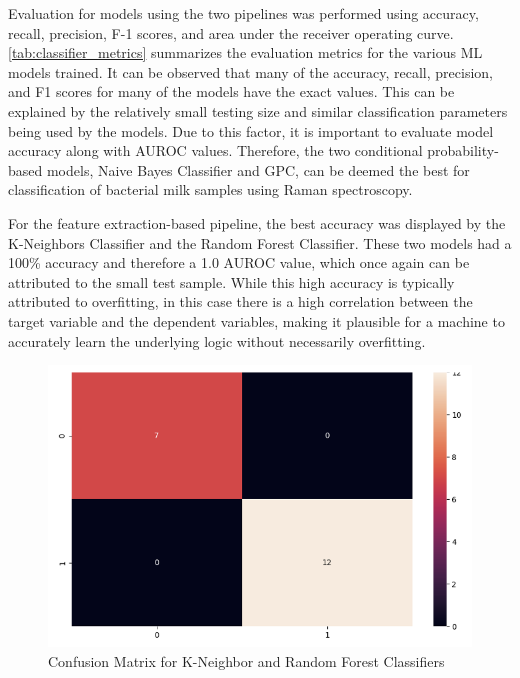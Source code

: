 Evaluation for models using the two pipelines was performed using accuracy, recall, precision, F-1 scores, and area under the receiver operating curve. \autoref{tab:classifier_metrics} summarizes the evaluation metrics for the various ML models trained. It can be observed that many of the accuracy, recall, precision, and F1 scores for many of the models have the exact values. This can be explained by the relatively small testing size and similar classification parameters being used by the models. Due to this factor, it is important to evaluate model accuracy along with AUROC values. Therefore, the two conditional probability-based models, Naive Bayes Classifier and GPC, can be deemed the best for classification of bacterial milk samples using Raman spectroscopy. \\

\begin{table}[htbp]
\raggedright
\caption{Performance comparison of various classifiers}
\label{tab:classifier_metrics}
\end{table}


\noindent For the feature extraction-based pipeline, the best accuracy was displayed by the K-Neighbors Classifier and the Random Forest Classifier. These two models had a 100\% accuracy and therefore a 1.0 AUROC value, which once again can be attributed to the small test sample. While this high accuracy is typically attributed to overfitting, in this case there is a high correlation between the target variable and the dependent variables, making it plausible for a machine to accurately learn the underlying logic without necessarily overfitting. 

\begin{figure}
    \centering
    \includegraphics[width=0.5\linewidth]{Figures/conf_matrix_rand forst.png}
    \caption{Confusion Matrix for K-Neighbor and Random Forest Classifiers}
    \label{fig:cfbest}
\end{figure}

